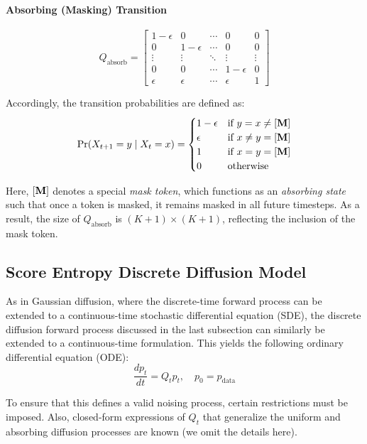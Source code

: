 \documentclass[11pt, a4paper]{article}
\begin{document}
\paragraph{Absorbing (Masking) Transition}

\[
Q_\text{absorb} = \left[ \begin{matrix}
    1 - \epsilon & 0 & \cdots & 0 & 0 \\
    0 & 1 - \epsilon & \cdots & 0 & 0 \\
    \vdots & \vdots & \ddots & \vdots & \vdots \\
    0 & 0 & \cdots & 1 - \epsilon & 0 \\
    \epsilon & \epsilon & \cdots & \epsilon & 1
\end{matrix} \right]
\]

Accordingly, the transition probabilities are defined as:
\[
\Pr(X_{t+1} = y \mid X_t = x) = \begin{cases}
    1 - \epsilon & \text{if } y = x \ne [{\bf M}] \\
    \epsilon & \text{if } x \ne y = [{\bf M}] \\
    1 & \text{if } x = y = [{\bf M}] \\
    0 & \text{otherwise}
\end{cases}
\]

Here, \([{\bf M}]\) denotes a special \emph{mask token}, which functions as an \emph{absorbing state} such that once a token is masked, it remains masked in all future timesteps. As a result, the size of \(Q_\text{absorb}\) is \((K + 1) \times (K + 1)\), reflecting the inclusion of the mask token.


\subsection{Score Entropy Discrete Diffusion Model}

As in Gaussian diffusion, where the discrete-time forward process can be extended to a continuous-time stochastic differential equation (SDE), the discrete diffusion forward process discussed in the last subsection can similarly be extended to a continuous-time formulation. This yields the following ordinary differential equation (ODE):
\[
\frac{dp_t}{dt}=Q_t p_t, \quad p_0=p_\text{data}
\]

To ensure that this defines a valid noising process, certain restrictions must be imposed. Also, closed-form expressions of \(Q_t\) that generalize the uniform and absorbing diffusion processes are known (we omit the details here).
\end{document}
